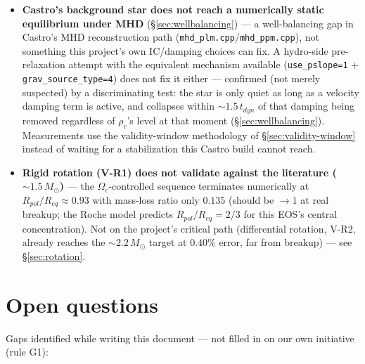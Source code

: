 \documentclass[11pt,a4paper]{scrartcl}
\newcommand{\code}[1]{\texttt{\small #1}}
\begin{document}
\begin{itemize}[leftmargin=1.4em,itemsep=0.4em]
  (\S\ref{sec:braithwaite}), and every result in
  \S\ref{sec:braithwaite}--\S\ref{sec:seed-study} comes from a real
  Castro build and real runs.
\item \textbf{Castro's background star does not reach a numerically
  static equilibrium under MHD} (\S\ref{sec:wellbalancing}) --- a
  well-balancing gap in Castro's MHD reconstruction path
  (\code{mhd\_plm.cpp}/\code{mhd\_ppm.cpp}), not something this
  project's own IC/damping choices can fix. A hydro-side pre-relaxation
  attempt with the equivalent mechanism available
  (\code{use\_pslope=1} + \code{grav\_source\_type=4}) does not fix it
  either --- confirmed (not merely suspected) by a discriminating test:
  the star is only quiet as long as a velocity damping term is active,
  and collapses within $\sim1.5\,t_{dyn}$ of that damping being removed
  regardless of $\rho_c$'s level at that moment (\S\ref{sec:wellbalancing}).
  Measurements use the validity-window methodology of
  \S\ref{sec:validity-window} instead of waiting for a stabilization
  this Castro build cannot reach.
\item \textbf{Rigid rotation (V-R1) does not validate against the
  literature ($\sim1.5\,M_\odot$)} --- the $\Omega_c$-controlled sequence
  terminates numerically at $R_{pol}/R_{eq}\approx0.93$ with mass-loss
  ratio only $0.135$ (should be $\to1$ at real breakup; the Roche model
  predicts $R_{pol}/R_{eq}=2/3$ for this EOS's central concentration).
  Not on the project's critical path (differential rotation, V-R2,
  already reaches the $\sim2.2\,M_\odot$ target at $0.40\%$ error, far
  from breakup) --- see \S\ref{sec:rotation}.
\end{itemize}

\section{Open questions}
\label{sec:aberto}

Gaps identified while writing this document --- not filled in on our own
initiative (rule G1):
\end{document}
